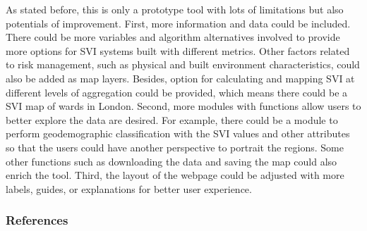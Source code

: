 \documentclass[]{article}
\begin{document}
As stated before, this is only a prototype tool with lots of limitations
but also potentials of improvement. First, more information and data
could be included. There could be more variables and algorithm
alternatives involved to provide more options for SVI systems built with
different metrics. Other factors related to risk management, such as
physical and built environment characteristics, could also be added as
map layers. Besides, option for calculating and mapping SVI at different
levels of aggregation could be provided, which means there could be a
SVI map of wards in London. Second, more modules with functions allow
users to better explore the data are desired. For example, there could
be a module to perform geodemographic classification with the SVI values
and other attributes so that the users could have another perspective to
portrait the regions. Some other functions such as downloading the data
and saving the map could also enrich the tool. Third, the layout of the
webpage could be adjusted with more labels, guides, or explanations for
better user experience.

\subsubsection{References}\label{references}
\end{document}
